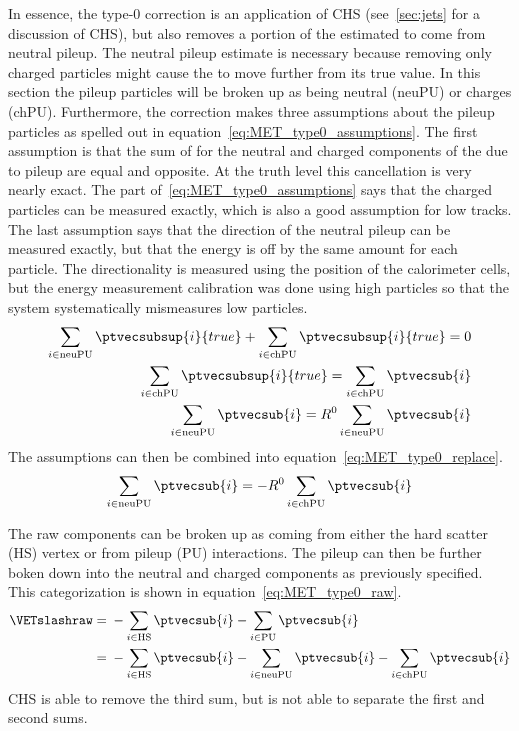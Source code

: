 In essence, the type-0 correction is an application of CHS (see~\ref{sec:jets} for a discussion of CHS), but also removes a portion of the \VETslash estimated to come from neutral pileup. The neutral pileup estimate is necessary because removing only charged particles might cause the \VETslash to move further from its true value. In this section the pileup particles will be broken up as being neutral (neuPU) or charges (chPU). Furthermore, the correction makes three assumptions about the pileup particles as spelled out in equation~\ref{eq:MET_type0_assumptions}. The first assumption is that the sum of \pt for the neutral and charged components of the \VETslash due to pileup are equal and opposite. At the truth level this cancellation is very nearly exact. The part of~\ref{eq:MET_type0_assumptions} says that the charged particles can be measured exactly, which is also a good assumption for low \ptvec tracks. The last assumption says that the direction of the neutral pileup can be measured exactly, but that the energy is off by the same amount for each particle. The directionality is measured using the position of the calorimeter cells, but the energy measurement calibration was done using high \ptvec particles so that the system systematically mismeasures low \ptvec particles.
\begin{equation}
\begin{aligned}
	\label{eq:MET_type0_assumptions}
\sum_{i \in \textrm{neuPU}}\ptvecsubsup{i}{true}+\sum_{i \in \textrm{chPU}}\ptvecsubsup{i}{true}=0 \\
\sum_{i \in \textrm{chPU}}\ptvecsubsup{i}{true}=\sum_{i \in \textrm{chPU}}\ptvecsub{i} \\
\sum_{i \in \textrm{neuPU}}\ptvecsub{i}=R^{0}\sum_{i \in \textrm{neuPU}}\ptvecsub{i}
\end{aligned}
\end{equation}
The assumptions can then be combined into equation~\ref{eq:MET_type0_replace}.
\begin{equation}
\begin{aligned}
	\label{eq:MET_type0_replace}
\sum_{i \in \textrm{neuPU}}\ptvecsub{i}=-R^{0}\sum_{i \in \textrm{chPU}}\ptvecsub{i}
\end{aligned}
\end{equation}

The raw \VETslash components can be broken up as coming from either the hard scatter (HS) vertex or from pileup (PU) interactions. The pileup can then be further boken down into the neutral and charged components as previously specified. This categorization is shown in equation~\ref{eq:MET_type0_raw}.
\begin{equation}
\begin{aligned}
	\label{eq:MET_type0_raw}
\VETslashraw={}&-\sum_{i \in \textrm{HS}}\ptvecsub{i}-\sum_{i \in \textrm{PU}}\ptvecsub{i} \\
={}&-\sum_{i \in \textrm{HS}}\ptvecsub{i}-\sum_{i \in \textrm{neuPU}}\ptvecsub{i}-\sum_{i \in \textrm{chPU}}\ptvecsub{i}
\end{aligned}
\end{equation}
CHS is able to remove the third sum, but is not able to separate the first and second sums.

